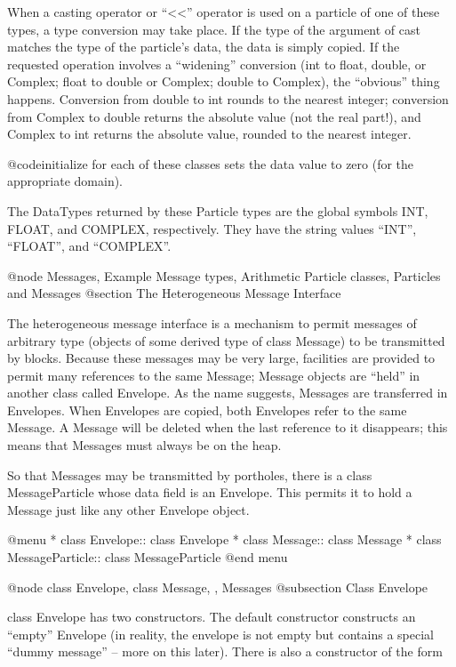 When a casting operator or ``<<'' operator is used on a particle of one of
these types, a type conversion may take place.  If the type of the
argument of cast matches the type of the particle's data, the data is
simply copied.  If the requested operation involves a ``widening''
conversion (int to float, double, or Complex; float to double or
Complex; double to Complex), the ``obvious'' thing happens.  Conversion
from double to int rounds to the nearest integer; conversion from
Complex to double returns the absolute value (not the real part!),
and Complex to int returns the absolute value, rounded to the nearest
integer.

@code{initialize} for each of these classes sets the data value to
zero (for the appropriate domain).

The DataTypes returned by these Particle types are the global symbols
INT, FLOAT, and COMPLEX, respectively.  They have the string values
``INT'', ``FLOAT'', and ``COMPLEX''.

@node Messages, Example Message types, Arithmetic Particle classes, Particles and Messages
@section The Heterogeneous Message Interface

The heterogeneous message interface is a mechanism to permit messages of
arbitrary type (objects of some derived type of class Message) to be
transmitted by blocks.  Because these messages may be very large,
facilities are provided to permit many references to the same Message;
Message objects are ``held'' in another class called Envelope.  As the
name suggests, Messages are transferred in Envelopes.  When Envelopes
are copied, both Envelopes refer to the same Message.  A Message will
be deleted when the last reference to it disappears; this means that
Messages must always be on the heap.

So that Messages may be transmitted by portholes, there is a class
MessageParticle whose data field is an Envelope.  This permits it to
hold a Message just like any other Envelope object.

@menu
* class Envelope::  class Envelope
* class Message::   class Message
* class MessageParticle::  class MessageParticle
@end menu

@node class Envelope, class Message,  , Messages
@subsection Class Envelope

class Envelope has two constructors.  The default constructor constructs
an ``empty'' Envelope (in reality, the envelope is not empty but contains
a special ``dummy message'' -- more on this later).  There is also a
constructor of the form

